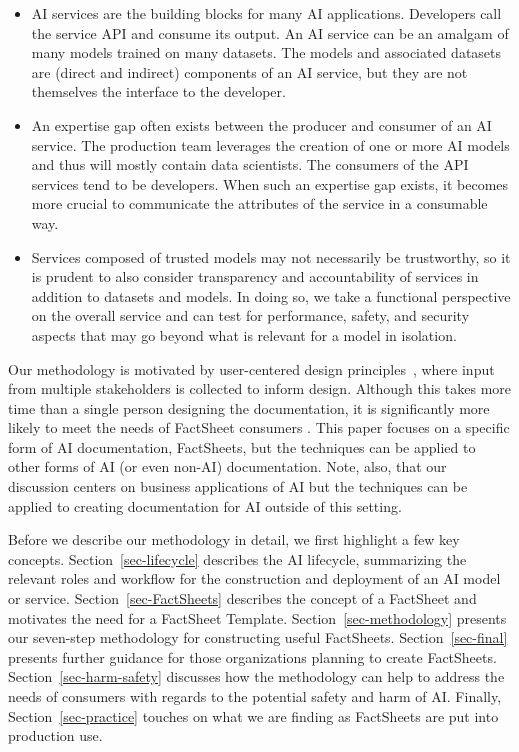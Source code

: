 \documentclass[11pt,dvipdfm]{article}
\begin{document}
\begin{itemize}[noitemsep,nolistsep]
    \item AI services are the building blocks for many AI applications.
Developers call the service API and
consume its output. An AI service can be an amalgam of many models
trained on many datasets.  The models and associated datasets are (direct
and indirect) components of an AI service, but they are not themselves the
interface to the developer.

\item An expertise gap often exists between the producer and consumer of
an AI service. The production team leverages the
creation of one or more AI models and thus will mostly contain data
scientists. The consumers of the API services tend to be developers.
When such an expertise gap exists, it becomes more crucial to communicate the attributes of the service in a consumable way.

\item Services composed of trusted models may not necessarily be trustworthy, so
it is prudent to also consider transparency and accountability of
services in addition to datasets and models. In doing so, we take a
functional perspective on the overall service and can test for
performance, safety, and security aspects that may go beyond what is relevant for a
model in isolation.
\end{itemize}
\hspace{.2cm}

Our methodology is motivated by user-centered design principles~\cite{mao2005}, where input from multiple stakeholders is collected to inform design. Although this takes more time than a single person designing the documentation, it is significantly more likely to meet the needs of FactSheet consumers \cite{madaio2020}.
This paper focuses on a specific form of AI documentation, FactSheets, but the techniques can be applied to other forms of AI (or even non-AI) documentation. Note, also, that our discussion centers on business applications of AI but the techniques can be applied to creating documentation for AI outside of this setting.

Before we describe our methodology in detail, we first highlight a few key concepts.  
Section~\ref{sec-lifecycle} describes the AI lifecycle, summarizing the relevant roles and workflow for the construction and deployment of an AI model or service.
Section~\ref{sec-FactSheets} describes the concept of a FactSheet and motivates the need for a FactSheet Template. Section~\ref{sec-methodology} presents our seven-step methodology for constructing useful FactSheets.
Section~\ref{sec-final} presents further guidance for those organizations planning to create FactSheets.
Section~\ref{sec-harm-safety} discusses how the methodology can help to address the needs of consumers with regards to the potential safety and harm of AI.
Finally, Section~\ref{sec-practice} touches on what we are finding as FactSheets are put into production use.
\end{document}
